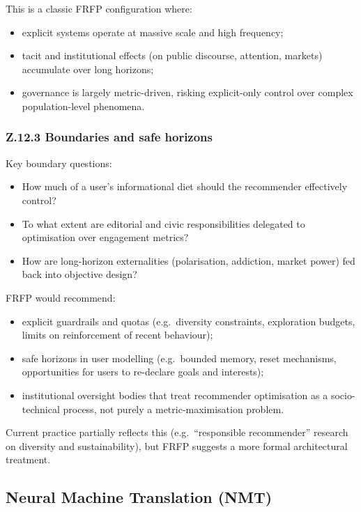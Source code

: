 This is a classic FRFP configuration where:

\begin{itemize}
\item explicit systems operate at massive scale and high frequency;
\item tacit and institutional effects (on public discourse, attention,
markets) accumulate over long horizons;
\item governance is largely metric-driven, risking explicit-only control
over complex population-level phenomena.
\end{itemize}

\subsubsection*{Z.12.3 Boundaries and safe horizons}

Key boundary questions:

\begin{itemize}
\item How much of a user’s informational diet should the recommender
effectively control?
\item To what extent are editorial and civic responsibilities delegated to
optimisation over engagement metrics?
\item How are long-horizon externalities (polarisation, addiction, market
power) fed back into objective design?
\end{itemize}

FRFP would recommend:

\begin{itemize}
\item explicit guardrails and quotas (e.g.\ diversity constraints,
exploration budgets, limits on reinforcement of recent behaviour);
\item safe horizons in user modelling (e.g.\ bounded memory, reset
mechanisms, opportunities for users to re-declare goals and
interests);
\item institutional oversight bodies that treat recommender optimisation as
a socio-technical process, not purely a metric-maximisation problem.
\end{itemize}

Current practice partially reflects this (e.g.\ “responsible recommender”
research on diversity and sustainability), but FRFP suggests a more formal
architectural treatment.

\subsection{Neural Machine Translation (NMT)}

